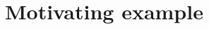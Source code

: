 \section{Motivating example}\label{sec:scapegoat-motivaing-example}



\begin{comment}
\subsection{Kevoree}
Kevoree is an open-source dynamic component platform, which relies on Models@run.time~\cite{BlairBF09} to properly support the dynamic adaptation of distributed systems.
Our use case application and the implementation of the Scapegoat framework make extensive use of the Kevoree framework.
The following subsections detail the background on component-based software architecture, introduce the Models@run.time paradigm and give an overview of the Kevoree platform.

\subsubsection{Component-based software architecture}

Software architecture aims at reducing complexity through abstraction and separation of concerns by providing a common understanding of component, connector and configuration~\cite{xadl,Medvidovic:2000,VanOmmering-et-al-00}.
One of the benefits is that it facilitates the management of dynamic architectures, which becomes a primary concern in the Future Internet and Cyber-Physical Systems~\cite{DBLP:journals/ase/NittoGMPP08, Johnson:2015:CSM:2735960.2735979}.
Such systems demand techniques that let software react to changes by self-organizing its structure and self-adapting its behavior~\cite{PanzicaLaManna:2012:LDU:2304736.2304764, Johnson:2015:CSM:2735960.2735979, Zhang:2009:MVD:1509239.1509262}.
Many works~\cite{cbse-conference} have shown the benefits of using component-based approaches in such open-world environments~\cite{baresi2006toward, Caporuscio:2010:AIA:1985522.1985547, Perez-Palacin:2010:PAO:1712605.1712614}.

To satisfy the needs for adaptation, several component models provide solutions to dynamically reconfigure a software architecture through, for example, the deployment of new modules, the instantiation of new services, and the creation of new bindings between components~\cite{Porter:2014:RMC:2602458.2602471, Zheng:2014:RCC:2679601.2680405, Irmert:2008:RAS:1370018.1370036, Ghezzi:2010:QDD:2163764.2163774}. 
In practice, component-based (and/or service-based) platforms like Fractal~\cite{bruneton06}, OpenCOM~\cite{BlairCULJ04}, OSGi~\cite{OSGI:r5} or SCA~\cite{SEINTURIER:2011:INRIA-00567442:1} provide platform mechanisms to support dynamic architectures.


\end{comment}
